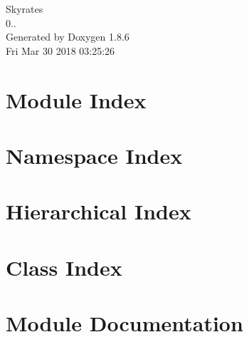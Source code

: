\documentclass[twoside]{book}
\newcommand{\clearemptydoublepage}{%
  \newpage{\pagestyle{empty}\cleardoublepage}%
}
\begin{document}
\hypersetup{pageanchor=false}
\begin{titlepage}
\vspace*{7cm}
\begin{center}%
{\Large Skyrates \\[1ex]\large 0.. }\\
\vspace*{1cm}
{\large Generated by Doxygen 1.8.6}\\
\vspace*{0.5cm}
{\small Fri Mar 30 2018 03:25:26}\\
\end{center}
\end{titlepage}
\clearemptydoublepage
\tableofcontents
\clearemptydoublepage
{}
\hypersetup{pageanchor=true}

\chapter{Module Index}

\chapter{Namespace Index}

\chapter{Hierarchical Index}

\chapter{Class Index}

\chapter{Module Documentation}




\end{document}
